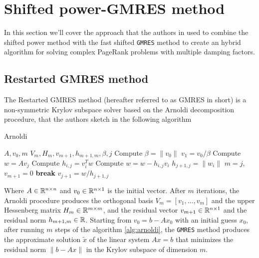 \clearpage
\section{Shifted power-GMRES method}

In this section we'll cover the approach that the authors in \cite{SHEN2022126799} used to combine the shifted power method with the fast shifted \texttt{GMRES} method to create an hybrid algorithm for solving complex PageRank problems with multiple damping factors.

\subsection{Restarted GMRES method}

The Restarted GMRES method (hereafter referred to as GMRES in short) is a non-symmetric Krylov subspace solver based on the Arnoldi decomposition procedure, that the authors sketch in the following algorithm

\begin{algorithm}[H]
\caption{Arnoldi}
\label{alg:arnoldi}
\begin{algorithmic}[1]
    \Require $A, v_0, m$
    \Ensure $V_m, H_m, v_{m+1}, h_{m+1,m}, \beta, j$
    \State Compute $\beta = \lVert v_0 \rVert$
    \State $v_1 = v_0/ \beta$
        \State Compute $w = Av_j$
            \State Compute $h_{i,j} = v_i^T w$
            \State Compute $w = w - h_{i,j} v_i$
        \EndFor
        \State $h_{j+1,j} = \lVert w_i \rVert$
            \State $m = j$, 
            \State $v_{m+1} = 0$
            \State \textbf{break}
        \Else
            \State $v_{j+1} = w / h_{j+1,j}$
        \EndIf
    \EndFor
\end{algorithmic}
\end{algorithm}

\noindent Where $A \in \mathbb{R}^{n\times n}$ and $v_0 \in \mathbb{R} ^{n \times 1}$ is the initial vector. After $m$ iterations, the Arnoldi procedure produces the orthogonal basis $V_m = [v_1, \dots, v_m]$ and the upper Hessenberg matrix $H_m \in \mathbb{R}^{m\times m}$, and the residual vector $v_{m+1} \in \mathbb{R}^{n \times 1}$ and the residual norm $h_{m+1,m} \in \mathbb{R}$. Starting from $v_0 = b - Ax_0$ with an initial guess $x_0$, after running $m$ steps of the algorithm \ref{alg:arnoldi}, the \texttt{GMRES} method produces the approximate solution $\tilde x$ of the linear system $Ax = b$ that minimizes the residual norm $\lVert b - Ax \rVert$ in the Krylov subspace of dimension $m$. \vspace*{0.4cm}

